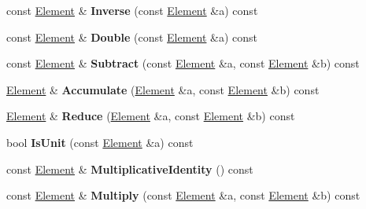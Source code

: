 \begin{DoxyCompactItemize}
\item 
\hypertarget{class_g_f_p2___o_n_b_ab1af91deb580a1279fd49390b6f186a6}{
const \hyperlink{class_g_f_p2_element}{Element} \& {\bfseries Inverse} (const \hyperlink{class_g_f_p2_element}{Element} \&a) const }
\label{class_g_f_p2___o_n_b_ab1af91deb580a1279fd49390b6f186a6}

\item 
\hypertarget{class_g_f_p2___o_n_b_a1211f09b8e18a97c367f34212771d184}{
const \hyperlink{class_g_f_p2_element}{Element} \& {\bfseries Double} (const \hyperlink{class_g_f_p2_element}{Element} \&a) const }
\label{class_g_f_p2___o_n_b_a1211f09b8e18a97c367f34212771d184}

\item 
\hypertarget{class_g_f_p2___o_n_b_a7c474968314921b9d176025b1ad8d49a}{
const \hyperlink{class_g_f_p2_element}{Element} \& {\bfseries Subtract} (const \hyperlink{class_g_f_p2_element}{Element} \&a, const \hyperlink{class_g_f_p2_element}{Element} \&b) const }
\label{class_g_f_p2___o_n_b_a7c474968314921b9d176025b1ad8d49a}

\item 
\hypertarget{class_g_f_p2___o_n_b_aa3ebe08c701e8c020fb764082128b54a}{
\hyperlink{class_g_f_p2_element}{Element} \& {\bfseries Accumulate} (\hyperlink{class_g_f_p2_element}{Element} \&a, const \hyperlink{class_g_f_p2_element}{Element} \&b) const }
\label{class_g_f_p2___o_n_b_aa3ebe08c701e8c020fb764082128b54a}

\item 
\hypertarget{class_g_f_p2___o_n_b_a1eb5dc1382210ee9d0678489a48db476}{
\hyperlink{class_g_f_p2_element}{Element} \& {\bfseries Reduce} (\hyperlink{class_g_f_p2_element}{Element} \&a, const \hyperlink{class_g_f_p2_element}{Element} \&b) const }
\label{class_g_f_p2___o_n_b_a1eb5dc1382210ee9d0678489a48db476}

\item 
\hypertarget{class_g_f_p2___o_n_b_a25f52100a3c7f53bd5cd96904335c820}{
bool {\bfseries IsUnit} (const \hyperlink{class_g_f_p2_element}{Element} \&a) const }
\label{class_g_f_p2___o_n_b_a25f52100a3c7f53bd5cd96904335c820}

\item 
\hypertarget{class_g_f_p2___o_n_b_aec704fcbc019e7a6f1d01631a08fead1}{
const \hyperlink{class_g_f_p2_element}{Element} \& {\bfseries MultiplicativeIdentity} () const }
\label{class_g_f_p2___o_n_b_aec704fcbc019e7a6f1d01631a08fead1}

\item 
\hypertarget{class_g_f_p2___o_n_b_ae8d293264154cc0c6b38f68f386d94c4}{
const \hyperlink{class_g_f_p2_element}{Element} \& {\bfseries Multiply} (const \hyperlink{class_g_f_p2_element}{Element} \&a, const \hyperlink{class_g_f_p2_element}{Element} \&b) const }
\label{class_g_f_p2___o_n_b_ae8d293264154cc0c6b38f68f386d94c4}


\end{DoxyCompactItemize}
